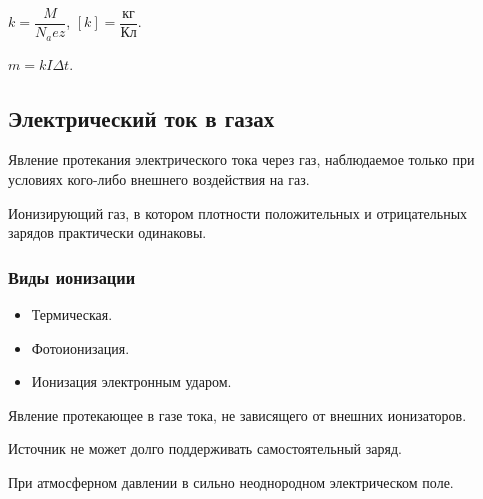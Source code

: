 \documentclass[12pt]{article}
\begin{document}
	\begin{definition}
		$k = \dfrac{M}{N_a e z}$, $[k] = \dfrac{\text{кг}}{\text{Кл}}$.
	\end{definition}
	
	\begin{law}
		$m = k I \varDelta t$.
	\end{law}
	
	\subsection{Электрический ток в газах}
	
	\begin{definition}
		Явление протекания электрического тока через газ, наблюдаемое только при условиях кого-либо внешнего воздействия на газ.
	\end{definition}
	
	\begin{definition}[Плазма]
		Ионизирующий газ, в котором плотности положительных и отрицательных зарядов практически одинаковы.
	\end{definition}
	
	\subsubsection{Виды ионизации}
	
	\begin{itemize}
		\item Термическая.
		\item Фотоионизация.
		\item Ионизация электронным ударом.
	\end{itemize}
	
	\begin{definition}
		Явление протекающее в газе тока, не зависящего от внешних ионизаторов.
	\end{definition}
	
	\begin{definition}
		Источник не может долго поддерживать самостоятельный заряд.
	\end{definition}
	
	\begin{definition}
		При атмосферном давлении в сильно неоднородном электрическом поле.
	\end{definition}
	
\end{document}
